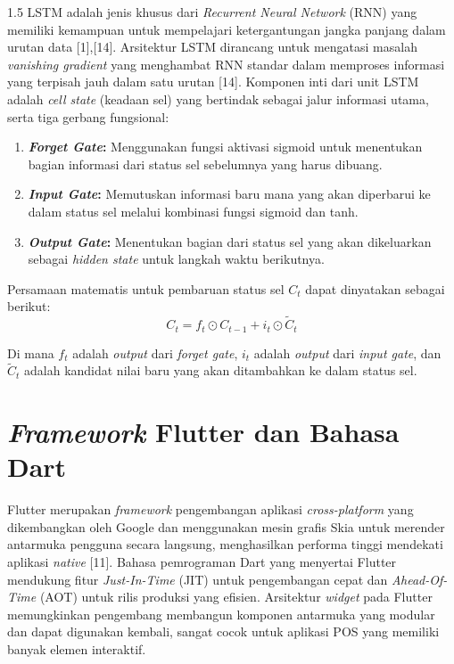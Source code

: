 \documentclass[12pt, a4paper, onecolumn, oneside]{report}
\begin{document}
\begin{spacing}{1.5}
LSTM adalah jenis khusus dari \textit{Recurrent Neural Network} (RNN) yang memiliki kemampuan untuk mempelajari ketergantungan jangka panjang dalam urutan data [1],[14]. Arsitektur LSTM dirancang untuk mengatasi masalah \textit{vanishing gradient} yang menghambat RNN standar dalam memproses informasi yang terpisah jauh dalam satu urutan [14]. Komponen inti dari unit LSTM adalah \textit{cell state} (keadaan sel) yang bertindak sebagai jalur informasi utama, serta tiga gerbang fungsional:
\begin{enumerate}
    \item \textbf{\textit{Forget Gate}:} Menggunakan fungsi aktivasi sigmoid untuk menentukan bagian informasi dari status sel sebelumnya yang harus dibuang.
    \item \textbf{\textit{Input Gate}:} Memutuskan informasi baru mana yang akan diperbarui ke dalam status sel melalui kombinasi fungsi sigmoid dan tanh.
    \item \textbf{\textit{Output Gate}:} Menentukan bagian dari status sel yang akan dikeluarkan sebagai \textit{hidden state} untuk langkah waktu berikutnya.
\end{enumerate}

Persamaan matematis untuk pembaruan status sel $C_t$ dapat dinyatakan sebagai berikut:
\begin{equation}
    C_t = f_t \odot C_{t-1} + i_t \odot \tilde{C}_t
\end{equation}

\noindent Di mana $f_t$ adalah \textit{output} dari \textit{forget gate}, $i_t$ adalah \textit{output} dari \textit{input gate}, dan $\tilde{C}_t$ adalah kandidat nilai baru yang akan ditambahkan ke dalam status sel.

\section{\textit{Framework} Flutter dan Bahasa Dart}

Flutter merupakan \textit{framework} pengembangan aplikasi \textit{cross-platform} yang dikembangkan oleh Google dan menggunakan mesin grafis Skia untuk merender antarmuka pengguna secara langsung, menghasilkan performa tinggi mendekati aplikasi \textit{native} [11]. Bahasa pemrograman Dart yang menyertai Flutter mendukung fitur \textit{Just-In-Time} (JIT) untuk pengembangan cepat dan \textit{Ahead-Of-Time} (AOT) untuk rilis produksi yang efisien. Arsitektur \textit{widget} pada Flutter memungkinkan pengembang membangun komponen antarmuka yang modular dan dapat digunakan kembali, sangat cocok untuk aplikasi POS yang memiliki banyak elemen interaktif.


\end{spacing}
\end{document}
